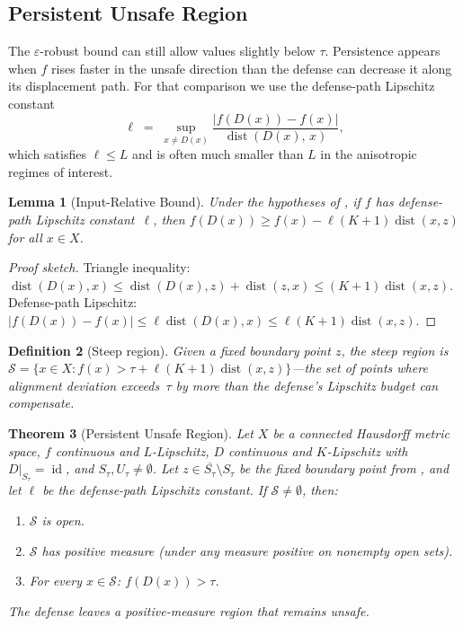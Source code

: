 \documentclass[11pt]{article}
\newtheorem{theorem}{Theorem}[section]
\newtheorem{lemma}[theorem]{Lemma}
\newtheorem{definition}[theorem]{Definition}
\newcommand{\cl}[1]{\overline{#1}}
\newcommand{\id}{\operatorname{id}}
\newcommand{\dist}{\operatorname{dist}}
\begin{document}
\subsection{Persistent Unsafe Region}
\label{sec:persistent}

The $\varepsilon$-robust bound can still allow values slightly below
$\tau$. Persistence appears when $f$ rises faster in the unsafe
direction than the defense can decrease it along its displacement path.
For that comparison we use the defense-path Lipschitz constant
\[
  \ell \;=\; \sup_{x \neq D(x)}
    \frac{|f(D(x)) - f(x)|}{\dist(D(x),\, x)},
\]
which satisfies $\ell \le L$ and is often much smaller than $L$ in the
anisotropic regimes of interest.

\begin{lemma}[Input-Relative Bound]
\label{lem:input-bound}
Under the hypotheses of , if $f$ has
defense-path Lipschitz constant~$\ell$, then
$f(D(x)) \geq f(x) - \ell(K+1)\dist(x,z)$
for all $x \in X$.
\end{lemma}

\begin{proof}[Proof sketch]
Triangle inequality:
$\dist(D(x), x) \leq \dist(D(x), z) + \dist(z, x)
\leq (K+1)\dist(x, z)$.
Defense-path Lipschitz: $|f(D(x)) - f(x)| \leq \ell\dist(D(x), x)
\leq \ell(K+1)\dist(x, z)$.
\end{proof}

\begin{definition}[Steep region]
\label{def:steep}
Given a fixed boundary point $z$, the \emph{steep region} is
$\mathcal{S} = \{x \in X : f(x) > \tau + \ell(K+1)\dist(x, z)\}$---the
set of points where alignment deviation exceeds~$\tau$ by more than
the defense's Lipschitz budget can compensate.
\end{definition}

\begin{theorem}[Persistent Unsafe Region]
\label{thm:persistent}
Let $X$ be a connected Hausdorff metric space, $f$ continuous and
$L$-Lipschitz, $D$ continuous and $K$-Lipschitz with
$D|_{S_\tau} = \id$, and $S_\tau, U_\tau \neq \emptyset$.
Let $z \in \cl{S_\tau} \setminus S_\tau$ be the fixed boundary
point from , and let $\ell$ be the defense-path
Lipschitz constant. If $\mathcal{S} \neq \emptyset$, then:
\begin{enumerate}[nosep]
  \item $\mathcal{S}$ is open.
  \item $\mathcal{S}$ has positive measure (under any measure positive
    on nonempty open sets).
  \item For every $x \in \mathcal{S}$: $f(D(x)) > \tau$.
\end{enumerate}
The defense leaves a positive-measure region that remains unsafe.
\end{theorem}
\end{document}
